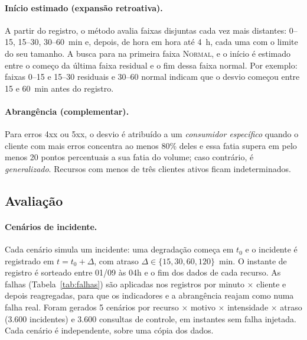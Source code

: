 \documentclass[sigconf,nonacm]{acmart}
\newcommand{\Normal}{\textsc{Normal}\xspace}
\begin{document}
\paragraph{Início estimado (expansão retroativa).} A partir do registro, o método avalia faixas disjuntas cada vez mais distantes: 0--15, 15--30, 30--60~min e, depois, de hora em hora até 4~h, cada uma com o limite do seu tamanho. A busca para na primeira faixa \Normal, e o início é estimado entre o começo da última faixa residual e o fim dessa faixa normal. Por exemplo: faixas 0--15 e 15--30 residuais e 30--60 normal indicam que o desvio começou entre 15 e 60~min antes do registro.

\paragraph{Abrangência (complementar).} Para erros 4xx ou 5xx, o desvio é atribuído a um \emph{consumidor específico} quando o cliente com mais erros concentra ao menos 80\% deles e essa fatia supera em pelo menos 20 pontos percentuais a sua fatia do volume; caso contrário, é \emph{generalizado}. Recursos com menos de três clientes ativos ficam indeterminados.

\subsection{Avaliação}

\paragraph{Cenários de incidente.} Cada cenário simula um incidente: uma degradação começa em $t_0$ e o incidente é registrado em $t=t_0+\Delta$, com atraso $\Delta\in\{15,30,60,120\}$~min. O instante de registro é sorteado entre 01/09 às 04h e o fim dos dados de cada recurso. As falhas (Tabela~\ref{tab:falhas}) são aplicadas nos registros por minuto $\times$ cliente e depois reagregadas, para que os indicadores e a abrangência reajam como numa falha real. Foram gerados 5 cenários por recurso $\times$ motivo $\times$ intensidade $\times$ atraso (3.600 incidentes) e 3.600 consultas de controle, em instantes sem falha injetada. Cada cenário é independente, sobre uma cópia dos dados.
\end{document}

